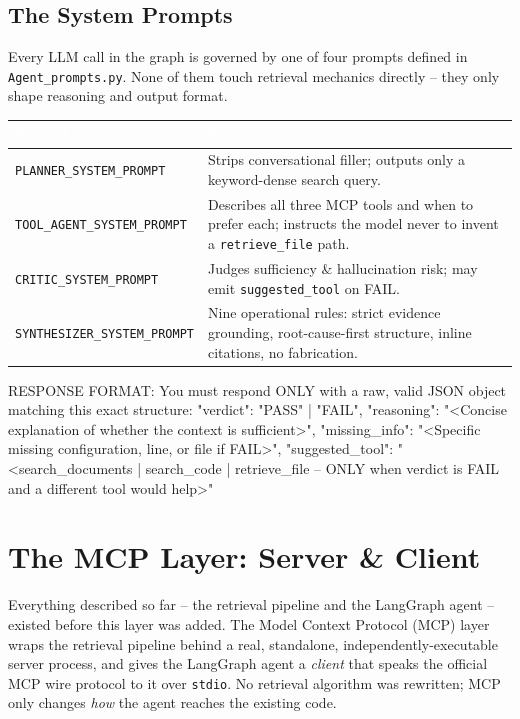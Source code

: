 \documentclass[11pt,a4paper]{article}
\begin{document}
\clearpage
\subsection{The System Prompts}
\label{sec:prompts}

Every LLM call in the graph is governed by one of four prompts defined in
\texttt{Agent\_prompts.py}. None of them touch retrieval mechanics directly
-- they only shape reasoning and output format.

\begin{tabularx}{\textwidth}{@{}l X@{}}
\toprule
\rowcolor{navylight}
\textcolor{white}{\textbf{Prompt}} & \textcolor{white}{\textbf{Role}} \\
\midrule
\texttt{PLANNER\_SYSTEM\_PROMPT} & Strips conversational filler; outputs only a keyword-dense search query. \\
\texttt{TOOL\_AGENT\_SYSTEM\_PROMPT} & Describes all three MCP tools and when to prefer each; instructs the model never to invent a \texttt{retrieve\_file} path. \\
\texttt{CRITIC\_SYSTEM\_PROMPT} & Judges sufficiency \& hallucination risk; may emit \texttt{suggested\_tool} on FAIL. \\
\texttt{SYNTHESIZER\_SYSTEM\_PROMPT} & Nine operational rules: strict evidence grounding, root-cause-first structure, inline citations, no fabrication. \\
\bottomrule
\end{tabularx}

\begin{pycode}
RESPONSE FORMAT:
You must respond ONLY with a raw, valid JSON object matching this exact structure:
{
  "verdict": "PASS" | "FAIL",
  "reasoning": "<Concise explanation of whether the context is sufficient>",
  "missing_info": "<Specific missing configuration, line, or file if FAIL>",
  "suggested_tool": "<search_documents | search_code | retrieve_file -- ONLY
                      when verdict is FAIL and a different tool would help>"
}
\end{pycode}



\section{The MCP Layer: Server \& Client}
\label{sec:mcp}

Everything described so far -- the retrieval pipeline and the LangGraph
agent -- existed before this layer was added. The Model Context Protocol
(MCP) layer wraps the retrieval pipeline behind a real, standalone,
independently-executable server process, and gives the LangGraph agent a
\emph{client} that speaks the official MCP wire protocol to it over
\texttt{stdio}. No retrieval algorithm was rewritten; MCP only changes
\emph{how} the agent reaches the existing code.
\end{document}
